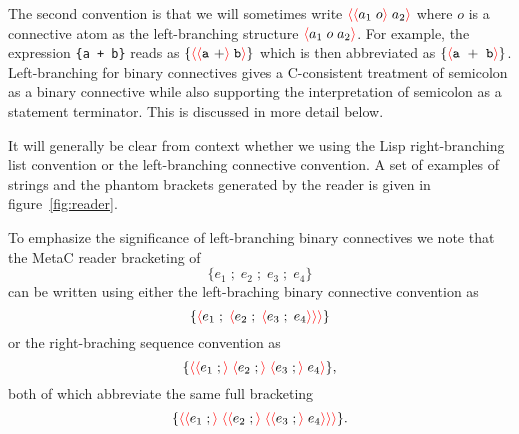 \documentclass{article}
\newcommand{\mtt}[1]{\mbox{\tt #1}}
\newcommand{\fopen}{{\color{red} \langle}}
\newcommand{\fclose}{{\color{red} \rangle}}
\begin{document}
The second convention is that we will sometimes write $\fopen \fopen a_1 \;o\fclose\;a_2\fclose$ where $o$ is a connective atom
as the left-branching structure $\fopen a_1\;o\;a_2 \fclose$.  For example, the expression \mtt{\{a + b\}} reads as
$\{\fopen \fopen \mathtt{a~+} \fclose \;\mathtt{b} \fclose \}$ which is then abbreviated as
$\{\fopen \mathtt{a~+~b} \fclose \}$.  Left-branching for binary connectives gives a
C-consistent treatment of semicolon as a binary connective while also supporting the interpretation of semicolon as a statement terminator.
This is discussed in more detail below.

It will generally be clear from context whether we using the Lisp right-branching list convention
or the left-branching connective convention.
A set of examples of strings and the phantom brackets generated by the reader is given in figure~\ref{fig:reader}.


To emphasize the significance of left-branching binary connectives we note that
the MetaC reader bracketing of
$$\{e_1\;;\;e_2\;;\;e_3\;;\;e_4\}$$
can be written using either the left-braching binary connective convention as
$$\{\fopen e_1\;;\;\fopen e_2\;;\;\fopen e_3\;;\;e_4\fclose\fclose\fclose\}$$
or the right-braching sequence convention as
$$\{\fopen \fopen e_1\;;\fclose \;\fopen e_2\;;\fclose \;\fopen e_3\;;\fclose\;e_4\fclose\},$$
both of which abbreviate the same full bracketing
$$\{\fopen \fopen e_1\;;\fclose \;\fopen \fopen e_2\;;\fclose \;\fopen \fopen e_3\;;\fclose\;e_4\fclose\fclose\fclose\}.$$
\end{document}
